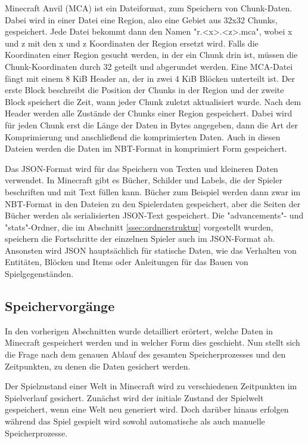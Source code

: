 Minecraft Anvil (MCA) ist ein Dateiformat, zum Speichern von Chunk-Daten. Dabei wird in einer Datei eine Region, also eine Gebiet aus 32x32 Chunks, gespeichert. Jede Datei bekommt dann den Namen "r.<x>.<z>.mca", wobei x und z mit den x und z Koordinaten der Region ersetzt wird. Falls die Koordinaten einer Region gesucht werden, in der ein Chunk drin ist, müssen die Chunk-Koordinaten durch 32 geteilt und abgerundet werden. Eine MCA-Datei fängt mit einem 8 KiB Header an, der in zwei 4 KiB Blöcken unterteilt ist. Der erste Block beschreibt die Position der Chunks in der Region und der zweite Block speichert die Zeit, wann jeder Chunk zuletzt aktualisiert wurde. Nach dem Header werden alle Zustände der Chunks einer Region gespeichert. Dabei wird für jeden Chunk erst die Länge der Daten in Bytes angegeben, dann die Art der Komprimierung und anschließend die komprimierten Daten.\cite{minecraftRegionFile}\cite{minecraftAnvilFile} Auch in diesen Dateien werden die Daten im NBT-Format in komprimiert Form gespeichert.\cite{minecraftNBT}

Das JSON-Format wird für das Speichern von Texten und kleineren Daten verwendet. In Minecraft gibt es Bücher, Schilder und Labels, die der Spieler beschriften und mit Text füllen kann. Bücher zum Beispiel werden dann zwar im NBT-Format in den Dateien zu den Spielerdaten gespeichert, aber die Seiten der Bücher werden als serialisierten JSON-Text gespeichert.\cite{minecraftPlayerdatFormat} Die "advancements"- und "stats"-Ordner, die im Abschnitt \ref{ssec:ordnerstruktur} vorgestellt wurden, speichern die Fortschritte der einzelnen Spieler auch im JSON-Format ab. Ansonsten wird JSON hauptsächlich für statische Daten, wie das Verhalten von Entitäten, Blöcken und Items oder Anleitungen für das Bauen von Spielgegenständen.\cite{minecraftJSON}


\subsection{Speichervorgänge}
In den vorherigen Abschnitten wurde detailliert erörtert, welche Daten in Minecraft gespeichert werden und in welcher Form dies geschieht. Nun stellt sich die Frage nach dem genauen Ablauf des gesamten Speicherprozesses und den Zeitpunkten, zu denen die Daten gesichert werden.

Der Spielzustand einer Welt in Minecraft wird zu verschiedenen Zeitpunkten im Spielverlauf gesichert. Zunächst wird der initiale Zustand der Spielwelt gespeichert, wenn eine Welt neu generiert wird. Doch darüber hinaus erfolgen während das Spiel gespielt wird sowohl automatische als auch manuelle Speicherprozesse.\cite{minecraftSpielstandSpeicherung}

